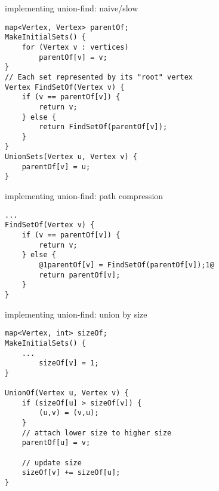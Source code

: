 \begin{frame}[fragile,label=unionFindNaive]{implementing union-find: naive/slow}
\lstset{language=C++,style=small}
\begin{lstlisting}
map<Vertex, Vertex> parentOf;
MakeInitialSets() {
    for (Vertex v : vertices)
        parentOf[v] = v;
}
// Each set represented by its "root" vertex
Vertex FindSetOf(Vertex v) {
    if (v == parentOf[v]) {
        return v;
    } else {
        return FindSetOf(parentOf[v]);
    }
}
UnionSets(Vertex u, Vertex v) {
    parentOf[v] = u;
}
\end{lstlisting}
\end{frame}

\begin{frame}[fragile,label=unionFindPathComp]{implementing union-find: path compression}
\begin{lstlisting}
...
FindSetOf(Vertex v) {
    if (v == parentOf[v]) {
        return v;
    } else {
        @1parentOf[v] = FindSetOf(parentOf[v]);1@
        return parentOf[v];
    }
}
\end{lstlisting}
\end{frame}

\begin{frame}[fragile,label=unionFindBySize]{implementing union-find: union by size}
\begin{lstlisting}
map<Vertex, int> sizeOf;  
MakeInitialSets() {
    ...
        sizeOf[v] = 1;
}

UnionOf(Vertex u, Vertex v) {
    if (sizeOf[u] > sizeOf[v]) {
        (u,v) = (v,u);
    }
    // attach lower size to higher size
    parentOf[u] = v;

    // update size
    sizeOf[v] += sizeOf[u];
}
\end{lstlisting}
\end{frame}
